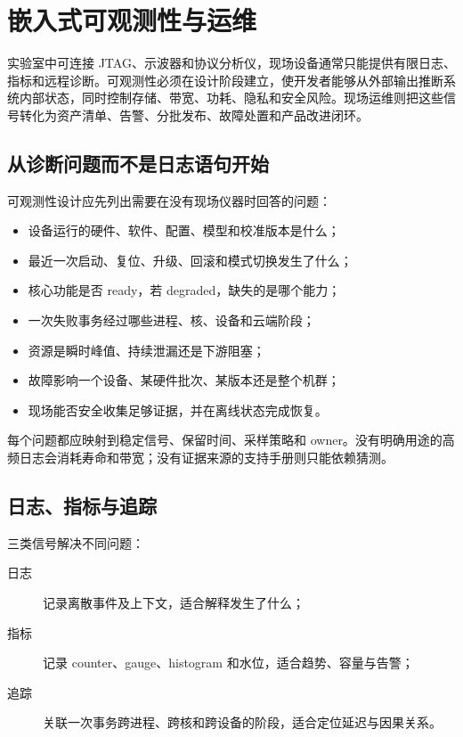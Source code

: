 \chapter{嵌入式可观测性与运维}
\label{chap:observability-fleet}

实验室中可连接 JTAG、示波器和协议分析仪，现场设备通常只能提供有限日志、指标和远程诊断。可观测性必须在设计阶段建立，使开发者能够从外部输出推断系统内部状态，同时控制存储、带宽、功耗、隐私和安全风险。现场运维则把这些信号转化为资产清单、告警、分批发布、故障处置和产品改进闭环。

\section{从诊断问题而不是日志语句开始}

可观测性设计应先列出需要在没有现场仪器时回答的问题：

\begin{itemize}
  \item 设备运行的硬件、软件、配置、模型和校准版本是什么；
  \item 最近一次启动、复位、升级、回滚和模式切换发生了什么；
  \item 核心功能是否 ready，若 degraded，缺失的是哪个能力；
  \item 一次失败事务经过哪些进程、核、设备和云端阶段；
  \item 资源是瞬时峰值、持续泄漏还是下游阻塞；
  \item 故障影响一个设备、某硬件批次、某版本还是整个机群；
  \item 现场能否安全收集足够证据，并在离线状态完成恢复。
\end{itemize}

每个问题都应映射到稳定信号、保留时间、采样策略和 owner。没有明确用途的高频日志会消耗寿命和带宽；没有证据来源的支持手册则只能依赖猜测。

\section{日志、指标与追踪}

三类信号解决不同问题：

\begin{description}
  \item[日志] 记录离散事件及上下文，适合解释发生了什么；
  \item[指标] 记录 counter、gauge、histogram 和水位，适合趋势、容量与告警；
  \item[追踪] 关联一次事务跨进程、跨核和跨设备的阶段，适合定位延迟与因果关系。
\end{description}

